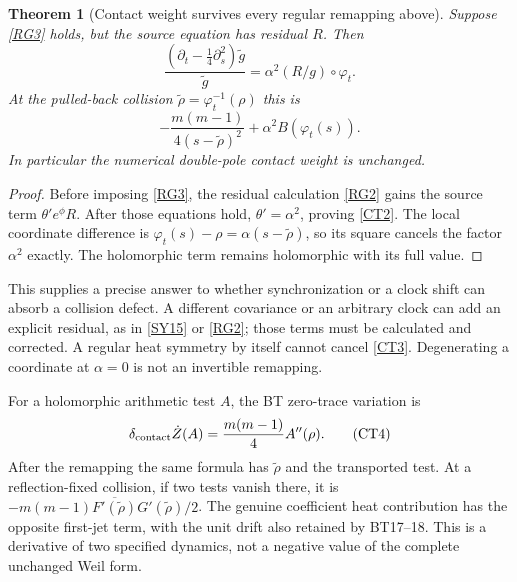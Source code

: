 \documentclass[11pt,a4paper]{article}
\newtheorem{theorem}{Theorem}[section]
\theoremstyle{definition}\newtheorem{definition}[theorem]{Definition}
\begin{document}
\begin{theorem}[Contact weight survives every regular remapping above]
Suppose \eqref{RG3} holds, but the source equation has residual $R$. Then
\begin{equation}
 \frac{(\partial_t-\tfrac14\partial_s^2)\widetilde g}{\widetilde g}
 =\alpha^2(R/g)\circ\varphi_t.                               \tag{CT2}\label{CT2}
\end{equation}
At the pulled-back collision $\widetilde\rho=\varphi_t^{-1}(\rho)$ this is
\begin{equation}
 \boxed{-\frac{m(m-1)}{4(s-\widetilde\rho)^2}
       +\alpha^2B(\varphi_t(s)).}                            \tag{CT3}\label{CT3}
\end{equation}
In particular the numerical double-pole contact weight is unchanged.
\end{theorem}
\begin{proof}
Before imposing \eqref{RG3}, the residual calculation \eqref{RG2} gains the source term $\theta' e^\phi R$. After those equations hold, $\theta'=\alpha^2$, proving \eqref{CT2}. The local coordinate difference is $\varphi_t(s)-\rho=\alpha(s-\widetilde\rho)$, so its square cancels the factor $\alpha^2$ exactly. The holomorphic term remains holomorphic with its full value.
\end{proof}

This supplies a precise answer to whether synchronization or a clock shift can absorb a collision defect. A different covariance or an arbitrary clock can add an explicit residual, as in \eqref{SY15} or \eqref{RG2}; those terms must be calculated and corrected. A regular heat symmetry by itself cannot cancel \eqref{CT3}. Degenerating a coordinate at $\alpha=0$ is not an invertible remapping.

For a holomorphic arithmetic test $A$, the BT zero-trace variation is
\begin{equation}
 \delta_{\rm contact}\dot Z(A)=\frac{m(m-1)}4A''(\rho).
                                                               \tag{CT4}\label{CT4}
\end{equation}
After the remapping the same formula has $\widetilde\rho$ and the transported test. At a reflection-fixed collision, if two tests vanish there, it is
$-m(m-1)\overline{F'(\widetilde\rho)}G'(\widetilde\rho)/2$.
The genuine coefficient heat contribution has the opposite first-jet term, with the unit drift also retained by BT17--18. This is a derivative of two specified dynamics, not a negative value of the complete unchanged Weil form.
\end{document}
